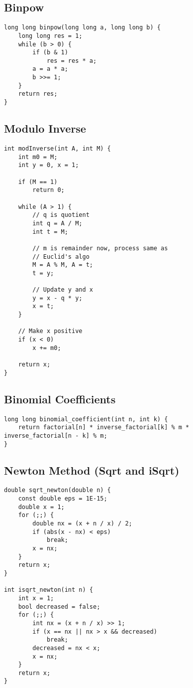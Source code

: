 \documentclass{article}
\begin{document}
\subsection{Binpow}
\begin{lstlisting}
long long binpow(long long a, long long b) {
    long long res = 1;
    while (b > 0) {
        if (b & 1)
            res = res * a;
        a = a * a;
        b >>= 1;
    }
    return res;
}
\end{lstlisting}
\subsection{Modulo Inverse}
\begin{lstlisting}
int modInverse(int A, int M) {
    int m0 = M;
    int y = 0, x = 1;

    if (M == 1)
        return 0;

    while (A > 1) {
        // q is quotient
        int q = A / M;
        int t = M;

        // m is remainder now, process same as
        // Euclid's algo
        M = A % M, A = t;
        t = y;

        // Update y and x
        y = x - q * y;
        x = t;
    }

    // Make x positive
    if (x < 0)
        x += m0;

    return x;
}
\end{lstlisting}
\subsection{Binomial Coefficients}
\begin{lstlisting}
long long binomial_coefficient(int n, int k) {
    return factorial[n] * inverse_factorial[k] % m * inverse_factorial[n - k] % m;
}
\end{lstlisting}
\subsection{Newton Method (Sqrt and iSqrt)}
\begin{lstlisting}
double sqrt_newton(double n) {
    const double eps = 1E-15;
    double x = 1;
    for (;;) {
        double nx = (x + n / x) / 2;
        if (abs(x - nx) < eps)
            break;
        x = nx;
    }
    return x;
}

int isqrt_newton(int n) {
    int x = 1;
    bool decreased = false;
    for (;;) {
        int nx = (x + n / x) >> 1;
        if (x == nx || nx > x && decreased)
            break;
        decreased = nx < x;
        x = nx;
    }
    return x;
}
\end{lstlisting}
\end{document}
